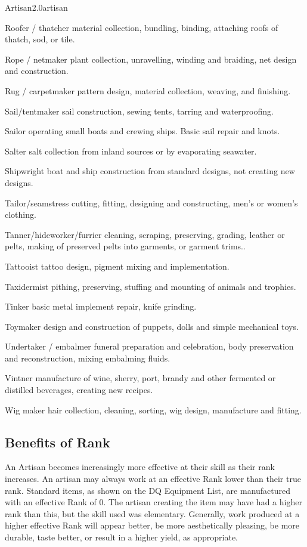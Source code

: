 \begin{skill}{Artisan}{2.0}{artisan}
\begin{Description}
\item[Roofer / thatcher] material collection, bundling, binding, attaching roofs of thatch, sod, or tile.
\item[Rope / netmaker] plant collection, unravelling, winding and braiding, net design and construction.
\item[Rug / carpetmaker] pattern design, material  collection, weaving, and finishing.
\item[Sail/tentmaker] sail construction, sewing tents, tarring and waterproofing.
\item[Sailor] operating small boats and crewing ships. Basic sail repair and knots.
\item[Salter] salt collection from inland sources or by evaporating seawater.
\item[Shipwright] boat and ship construction from standard designs, not creating new designs.
\item[Tailor/seamstress] cutting, fitting, designing and constructing, men's or women's clothing.
\item[Tanner/hideworker/furrier] cleaning, scraping, preserving, grading, leather or pelts, making of preserved pelts into garments, or garment trims..
\item[Tattooist] tattoo design, pigment mixing and implementation.
\item[Taxidermist] pithing, preserving, stuffing and mounting of animals and trophies.
\item[Tinker] basic metal implement repair, knife grinding.
\item[Toymaker] design and construction of puppets, dolls and simple mechanical toys.
\item[Undertaker / embalmer] funeral preparation and celebration, body preservation and reconstruction, mixing embalming fluids.
\item[Vintner] manufacture of wine, sherry, port, brandy and other fermented or distilled beverages, creating new recipes.
\item[Wig maker] hair collection, cleaning, sorting, wig design, manufacture and fitting.
\end{Description}

\subsection{Benefits of Rank}

An Artisan becomes increasingly more effective at their skill as their
rank increases. An artisan may always work at an effective Rank lower
than their true rank. Standard items, as shown on the DQ Equipment
List, are manufactured with an effective Rank of 0.  The artisan
creating the item may have had a higher rank than this, but the skill
used was elementary. Generally, work produced at a higher effective
Rank will appear better, be more aesthetically pleasing, be more
durable, taste better, or result in a higher yield, as appropriate.


\end{skill}
